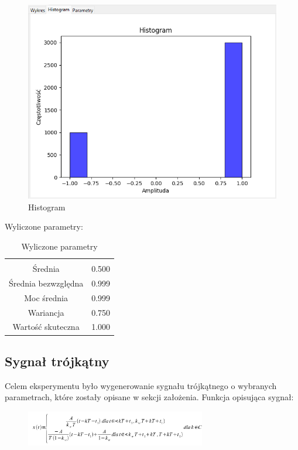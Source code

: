 \documentclass{article}
\begin{document}
\begin{figure}[h!]
    \centering
    \includegraphics[width=\textwidth]{img/prostokatsymetryczny/hist.png}
    \caption{Histogram}
\end{figure}
\FloatBarrier
Wyliczone parametry:
\begin{table}[h!]
    \centering
    \vspace{0.2cm}
    \begin{tabular}{|c|c|}
        \hline\hline\\[-0.4cm]
        Średnia & 0.500  \\
        \hline
        Średnia bezwzględna & 0.999  \\
        \hline
        Moc średnia & 0.999  \\
        \hline
        Wariancja & 0.750 \\
        \hline
        Wartość skuteczna & 1.000 \\
        \hline
    \end{tabular}
    \caption{Wyliczone parametry}
    \label{prostokatsymetryczny}
\end{table}

\subsection{Sygnał trójkątny} \label{trojkat} 
Celem eksperymentu było wygenerowanie sygnału trójkątnego o wybranych parametrach,
które zostały opisane w sekcji założenia. Funkcja opisująca sygnał:

\begin{figure}[!htbp]
    \centering
    \includegraphics[width=0.7\textwidth]{img/trojkat.png}
\end{figure}
\end{document}

